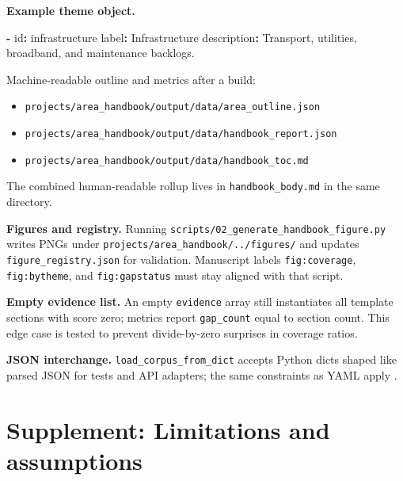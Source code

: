 \documentclass[
]{article}
\newenvironment{Shaded}{}{}
\newcommand{\AttributeTok}[1]{\textcolor[rgb]{0.49,0.56,0.16}{#1}}
\newcommand{\FunctionTok}[1]{\textcolor[rgb]{0.02,0.16,0.49}{#1}}
\newcommand{\KeywordTok}[1]{\textcolor[rgb]{0.00,0.44,0.13}{\textbf{#1}}}
\providecommand{\tightlist}{%
  \setlength{\itemsep}{0pt}\setlength{\parskip}{0pt}}
\begin{document}
\textbf{Example theme object.}

\begin{Shaded}
\begin{Highlighting}[]
\KeywordTok{{-}}\AttributeTok{ }\FunctionTok{id}\KeywordTok{:}\AttributeTok{ infrastructure}
\AttributeTok{  }\FunctionTok{label}\KeywordTok{:}\AttributeTok{ Infrastructure}
\AttributeTok{  }\FunctionTok{description}\KeywordTok{:}\AttributeTok{ Transport, utilities, broadband, and maintenance backlogs.}
\end{Highlighting}
\end{Shaded}

Machine-readable outline and metrics after a build:

\begin{itemize}
\tightlist
\item
  \texttt{projects/area\_handbook/output/data/area\_outline.json}
\item
  \texttt{projects/area\_handbook/output/data/handbook\_report.json}
\item
  \texttt{projects/area\_handbook/output/data/handbook\_toc.md}
\end{itemize}

The combined human-readable rollup lives in \texttt{handbook\_body.md}
in the same directory.

\textbf{Figures and registry.} Running
\texttt{scripts/02\_generate\_handbook\_figure.py} writes PNGs under
\texttt{projects/area\_handbook/../figures/} and updates
\texttt{figure\_registry.json} for validation. Manuscript labels
\texttt{fig:coverage}, \texttt{fig:bytheme}, and \texttt{fig:gapstatus}
must stay aligned with that script.

\textbf{Empty evidence list.} An empty \texttt{evidence} array still
instantiates all template sections with score zero; metrics report
\texttt{gap\_count} equal to section count. This edge case is tested to
prevent divide-by-zero surprises in coverage ratios.

\textbf{JSON interchange.} \texttt{load\_corpus\_from\_dict} accepts
Python dicts shaped like parsed JSON for tests and API adapters; the
same constraints as YAML apply \citep{template2026}.

\newpage

\section{Supplement: Limitations and
assumptions}\label{supplement-limitations-and-assumptions}
\end{document}
